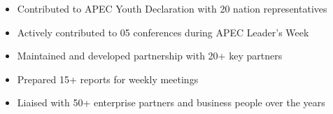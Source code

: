 \documentclass[10pt,a4paper,ragged2e]{altacv}
\begin{document}
\begin{itemize}
	\item Contributed to APEC Youth Declaration with 20 nation representatives
	\item Actively contributed to 05 conferences during APEC Leader's Week
\end{itemize}

\divider

\begin{itemize}
	\item Maintained and developed partnership with 20+ key partners
	\item Prepared 15+ reports for weekly meetings
	\item Liaised with 50+ enterprise partners and business people over the years
\end{itemize}
\end{document}
